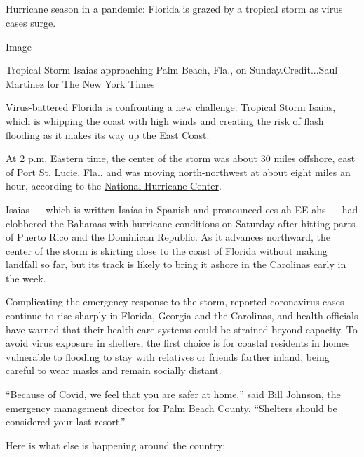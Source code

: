 \hypertarget{-5}{%
\subsection{}\label{-5}}

Hurricane season in a pandemic: Florida is grazed by a tropical storm as
virus cases surge.

Image

Tropical Storm Isaias approaching Palm Beach, Fla., on
Sunday.Credit...Saul Martinez for The New York Times

Virus-battered Florida is confronting a new challenge: Tropical Storm
Isaias, which is whipping the coast with high winds and creating the
risk of flash flooding as it makes its way up the East Coast.

At 2 p.m. Eastern time, the center of the storm was about 30 miles
offshore, east of Port St. Lucie, Fla., and was moving north-northwest
at about eight miles an hour, according to the
\href{https://www.nhc.noaa.gov/text/refresh/MIATCPAT4+shtml/020856.shtml?}{National
Hurricane Center}.

Isaias --- which is written Isaías in Spanish and pronounced
ees-ah-EE-ahs --- had clobbered the Bahamas with hurricane conditions on
Saturday after hitting parts of Puerto Rico and the Dominican Republic.
As it advances northward, the center of the storm is skirting close to
the coast of Florida without making landfall so far, but its track is
likely to bring it ashore in the Carolinas early in the week.

Complicating the emergency response to the storm, reported coronavirus
cases continue to rise sharply in Florida, Georgia and the Carolinas,
and health officials have warned that their health care systems could be
strained beyond capacity. To avoid virus exposure in shelters, the first
choice is for coastal residents in homes vulnerable to flooding to stay
with relatives or friends farther inland, being careful to wear masks
and remain socially distant.

``Because of Covid, we feel that you are safer at home,'' said Bill
Johnson, the emergency management director for Palm Beach County.
``Shelters should be considered your last resort.''

Here is what else is happening around the country:

